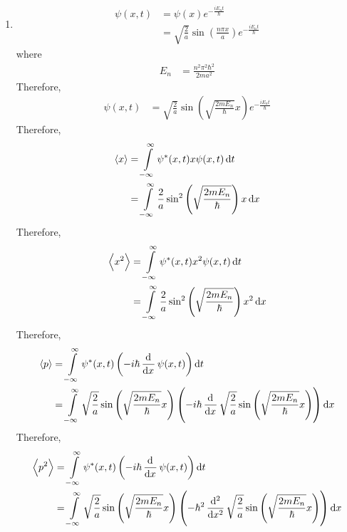 \documentclass[fleqn, a4paper, 11pt, oneside]{amsart}
\theoremstyle{definition}
\theoremstyle{theorem}
\begin{document}
\begin{solution}
\begin{enumerate}[leftmargin=*]
\begin{figure}[H]
			\end{figure}
		\item
			\begin{align*}
				\psi(x,t) & = \psi(x) e^{-\frac{i E_n t}{\hbar}} \\
                                          & = \sqrt{\frac{2}{a}} \sin\left( \frac{n \pi x}{a} \right) e^{-\frac{i E_n t}{\hbar}}
			\end{align*}
			where
			\begin{align*}
				E_n & = \frac{n^2 \pi^2 \hbar^2}{2 m a^2}
			\end{align*}
			Therefore,
			\begin{align*}
				\psi(x,t) & = \sqrt{\frac{2}{a}} \sin\left( \sqrt{\frac{2 m E_n}{\hbar}} x \right) e^{-\frac{i E_n t}{\hbar}}
			\end{align*}
			Therefore,
			\begin{align*}
				\langle x \rangle & = \int\limits_{-\infty}^{\infty} \psi^*(x,t) x \psi(x,t) \dif t \\
                                                  & = \int\limits_{-\infty}^{\infty} \frac{2}{a} \sin^2 \left( \sqrt{\frac{2 m E_n}{\hbar}} \right) x \dif x
			\end{align*}
			Therefore,
			\begin{align*}
				\left\langle x^2 \right\rangle & = \int\limits_{-\infty}^{\infty} \psi^*(x,t) x^2 \psi(x,t) \dif t \\
                                                               & = \int\limits_{-\infty}^{\infty} \frac{2}{a} \sin^2 \left( \sqrt{\frac{2 m E_n}{\hbar}} \right) x^2 \dif x
			\end{align*}
			Therefore,
			\begin{align*}
				\langle p \rangle & = \int\limits_{-\infty}^{\infty} \psi^*(x,t) \left( -i \hbar \dod{}{x} \psi(x,t) \right) \dif t \\
                                                  & = \int\limits_{-\infty}^{\infty} \sqrt{\frac{2}{a}} \sin\left( \sqrt{\frac{2 m E_n}{\hbar}} x \right) \left( -i \hbar \dod{}{x} \sqrt{\frac{2}{a}} \sin\left( \sqrt{\frac{2 m E_n}{\hbar}} x \right) \right) \dif x
			\end{align*}
			Therefore,
			\begin{align*}
				\left\langle p^2 \right\rangle & = \int\limits_{-\infty}^{\infty} \psi^*(x,t) \left( -i \hbar \dod{}{x} \psi(x,t) \right) \dif t \\
                                                               & = \int\limits_{-\infty}^{\infty} \sqrt{\frac{2}{a}} \sin\left( \sqrt{\frac{2 m E_n}{\hbar}} x \right) \left( -\hbar^2 \dod[2]{}{x} \sqrt{\frac{2}{a}} \sin\left( \sqrt{\frac{2 m E_n}{\hbar}} x \right) \right) \dif x
			\end{align*}
	\end{enumerate}
\end{solution}
\end{document}
